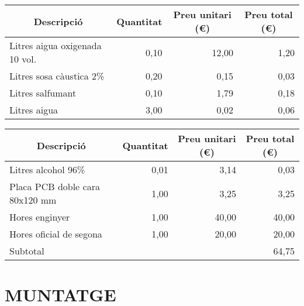 \begin{table}[H]
  \begin{center}
    \begin{tabularx} {\textwidth} {|X|r|r|r|} \hline
  \multicolumn{1}{|c|}{Descripció} &  \multicolumn{1}{c|}{Quantitat} & \multicolumn{1}{c|}{Preu unitari (€)} &  \multicolumn{1}{c|}{Preu total (€)}\\ \hline \hline
    Litres aigua oxigenada 10 vol. & 0,10  & 12,00 & 1,20 \\ \hline
    Litres sosa càustica 2\% & 0,20  & 0,15  & 0,03 \\ \hline
    Litres salfumant & 0,10  & 1,79  & 0,18 \\ \hline
          Litres aigua & 3,00  & 0,02  & 0,06 \\ \hline
    \end{tabularx}%
  \end{center}
  \label{tab:addlabel}%
\end{table}%
%
\begin{table}[H]
  \begin{center}
    \begin{tabularx} {\textwidth} {|X|r|r|r|} \hline
  \multicolumn{1}{|c|}{Descripció} &  \multicolumn{1}{c|}{Quantitat} & \multicolumn{1}{c|}{Preu unitari (€)} &  \multicolumn{1}{c|}{Preu total (€)}\\ \hline \hline
      Litres alcohol 96\% & 0,01  & 3,14  & 0,03 \\ \hline
          Placa PCB doble cara 80x120 mm & 1,00  & 3,25  & 3,25 \\ \hline
                  Hores enginyer & 1,00     & 40,00 & 40,00 \\ \hline
    Hores oficial de segona & 1,00  & 20,00 & 20,00 \\ \hline \hline
    \multicolumn{3}{|l}{Subtotal} & 64,75 \\ \hline
    \end{tabularx}%
  \end{center}
  \label{tab:addlabel}%
\end{table}%



\section{\uppercase{Muntatge}}

